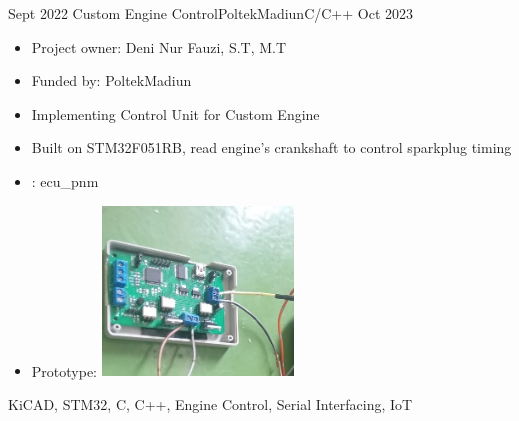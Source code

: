 \begin{experiences}
    \emptySeparator
    \experience
    {Sept 2022} {Custom Engine Control}{PoltekMadiun}{C/C++}
    {Oct 2023} {
        \begin{itemize}
            \item Project owner: Deni Nur Fauzi, S.T, M.T
            \item Funded by: PoltekMadiun
            \item Implementing Control Unit for Custom Engine
            \item Built on STM32F051RB, read engine's crankshaft to control sparkplug timing
            \item \faGithub:  {ecu\_pnm}
            \item Prototype: \includegraphics[width=0.4\textwidth]{images/ecu_pnm.jpg}
        \end{itemize}
    }
    {KiCAD, STM32, C, C++, Engine Control, Serial Interfacing, IoT}


\end{experiences}
